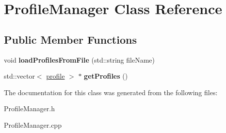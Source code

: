 \hypertarget{class_profile_manager}{\section{Profile\+Manager Class Reference}
\label{class_profile_manager}
}
\subsection*{Public Member Functions}
\begin{DoxyCompactItemize}
\item 
\hypertarget{class_profile_manager_a2465a14f4a641d033efafad1b6386543}{void {\bfseries load\+Profiles\+From\+File} (std\+::string file\+Name)}\label{class_profile_manager_a2465a14f4a641d033efafad1b6386543}

\item 
\hypertarget{class_profile_manager_a2ddbbea97ffb2c2b577d360b3c54112f}{std\+::vector$<$ \hyperlink{structprofile}{profile} $>$ $\ast$ {\bfseries get\+Profiles} ()}\label{class_profile_manager_a2ddbbea97ffb2c2b577d360b3c54112f}

\end{DoxyCompactItemize}


The documentation for this class was generated from the following files\+:\begin{DoxyCompactItemize}
\item 
Profile\+Manager.\+h\item 
Profile\+Manager.\+cpp\end{DoxyCompactItemize}
